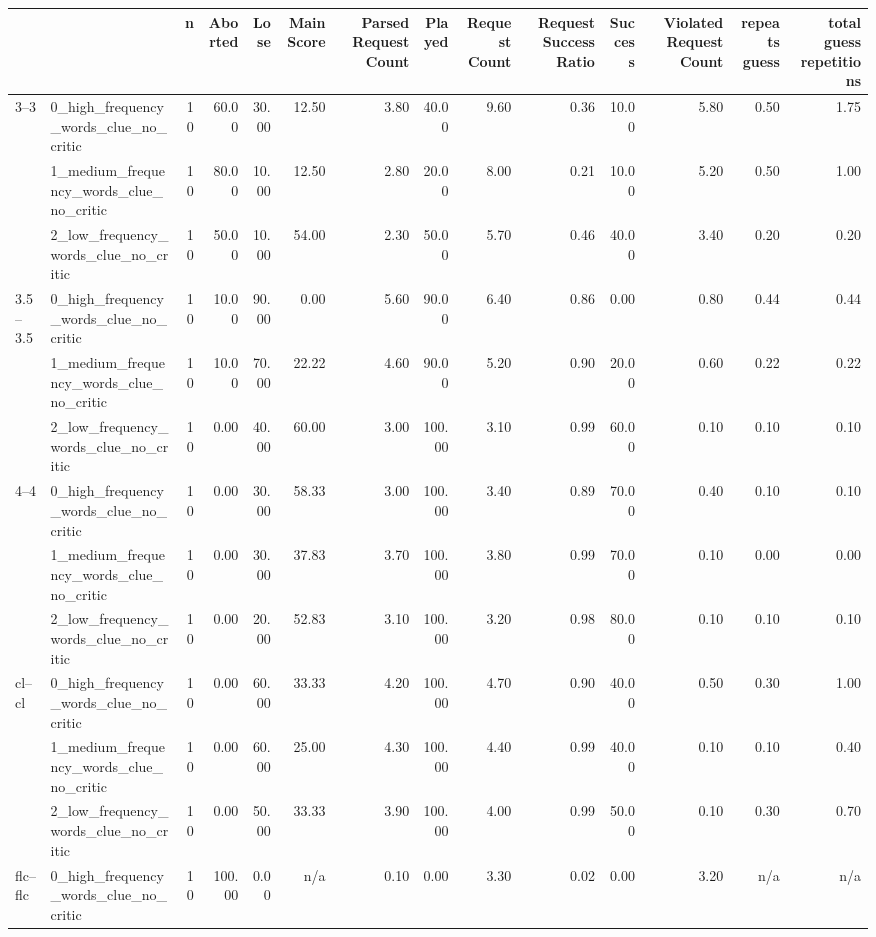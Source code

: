 \begin{tabular}{llrrrrrrrrrrrr}
\toprule
 &  & n & Aborted & Lose & Main Score & Parsed Request Count & Played & Request Count & Request Success Ratio & Success & Violated Request Count & repeats guess & total guess repetitions \\
\midrule
\multirow[t]{3}{*}{3--3} & 0_high_frequency_words_clue_no_critic & 10 & 60.00 & 30.00 & 12.50 & 3.80 & 40.00 & 9.60 & 0.36 & 10.00 & 5.80 & 0.50 & 1.75 \\
 & 1_medium_frequency_words_clue_no_critic & 10 & 80.00 & 10.00 & 12.50 & 2.80 & 20.00 & 8.00 & 0.21 & 10.00 & 5.20 & 0.50 & 1.00 \\
 & 2_low_frequency_words_clue_no_critic & 10 & 50.00 & 10.00 & 54.00 & 2.30 & 50.00 & 5.70 & 0.46 & 40.00 & 3.40 & 0.20 & 0.20 \\
\cline{1-14}
\multirow[t]{3}{*}{3.5--3.5} & 0_high_frequency_words_clue_no_critic & 10 & 10.00 & 90.00 & 0.00 & 5.60 & 90.00 & 6.40 & 0.86 & 0.00 & 0.80 & 0.44 & 0.44 \\
 & 1_medium_frequency_words_clue_no_critic & 10 & 10.00 & 70.00 & 22.22 & 4.60 & 90.00 & 5.20 & 0.90 & 20.00 & 0.60 & 0.22 & 0.22 \\
 & 2_low_frequency_words_clue_no_critic & 10 & 0.00 & 40.00 & 60.00 & 3.00 & 100.00 & 3.10 & 0.99 & 60.00 & 0.10 & 0.10 & 0.10 \\
\cline{1-14}
\multirow[t]{3}{*}{4--4} & 0_high_frequency_words_clue_no_critic & 10 & 0.00 & 30.00 & 58.33 & 3.00 & 100.00 & 3.40 & 0.89 & 70.00 & 0.40 & 0.10 & 0.10 \\
 & 1_medium_frequency_words_clue_no_critic & 10 & 0.00 & 30.00 & 37.83 & 3.70 & 100.00 & 3.80 & 0.99 & 70.00 & 0.10 & 0.00 & 0.00 \\
 & 2_low_frequency_words_clue_no_critic & 10 & 0.00 & 20.00 & 52.83 & 3.10 & 100.00 & 3.20 & 0.98 & 80.00 & 0.10 & 0.10 & 0.10 \\
\cline{1-14}
\multirow[t]{3}{*}{cl--cl} & 0_high_frequency_words_clue_no_critic & 10 & 0.00 & 60.00 & 33.33 & 4.20 & 100.00 & 4.70 & 0.90 & 40.00 & 0.50 & 0.30 & 1.00 \\
 & 1_medium_frequency_words_clue_no_critic & 10 & 0.00 & 60.00 & 25.00 & 4.30 & 100.00 & 4.40 & 0.99 & 40.00 & 0.10 & 0.10 & 0.40 \\
 & 2_low_frequency_words_clue_no_critic & 10 & 0.00 & 50.00 & 33.33 & 3.90 & 100.00 & 4.00 & 0.99 & 50.00 & 0.10 & 0.30 & 0.70 \\
\cline{1-14}
\multirow[t]{3}{*}{flc--flc} & 0_high_frequency_words_clue_no_critic & 10 & 100.00 & 0.00 & n/a & 0.10 & 0.00 & 3.30 & 0.02 & 0.00 & 3.20 & n/a & n/a \\

\end{tabular}
